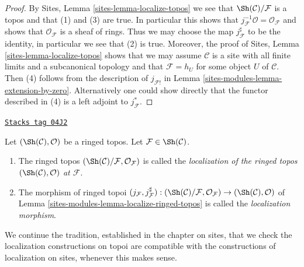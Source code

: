 \begin{proof}
By
Sites, Lemma \ref{sites-lemma-localize-topos}
we see that $\Sh(\mathcal{C})/\mathcal{F}$ is a topos
and that (1) and (3) are true. In particular this shows that
$j_\mathcal{F}^{-1}\mathcal{O} = \mathcal{O}_\mathcal{F}$
and shows that $\mathcal{O}_\mathcal{F}$ is a sheaf of rings.
Thus we may choose the map $j_\mathcal{F}^\sharp$ to be the identity,
in particular we see that (2) is true.
Moreover, the proof of
Sites, Lemma \ref{sites-lemma-localize-topos}
shows that we may assume $\mathcal{C}$ is a site with all finite limits
and a subcanonical topology and that $\mathcal{F} = h_U$ for some object
$U$ of $\mathcal{C}$.
Then (4) follows from the description of $j_{\mathcal{F}!}$ in
Lemma \ref{sites-modules-lemma-extension-by-zero}.
Alternatively one could show directly that the functor described
in (4) is a left adjoint to $j_\mathcal{F}^*$.
\end{proof}

\begin{definition}
\label{sites-modules-definition-localize-ringed-topos}
\href{https://stacks.math.columbia.edu/tag/04J2}{\texttt{Stacks tag 04J2}}

Let $(\Sh(\mathcal{C}), \mathcal{O})$ be a ringed topos.
Let $\mathcal{F} \in \Sh(\mathcal{C})$.
\begin{enumerate}
\item The ringed topos
$(\Sh(\mathcal{C})/\mathcal{F}, \mathcal{O}_\mathcal{F})$
is called the
{\it localization of the ringed topos
$(\Sh(\mathcal{C}), \mathcal{O})$ at $\mathcal{F}$}.
\item The morphism of ringed topoi
$(j_\mathcal{F}, j_\mathcal{F}^\sharp) :
(\Sh(\mathcal{C})/\mathcal{F}, \mathcal{O}_\mathcal{F})
\to
(\Sh(\mathcal{C}), \mathcal{O})$ of
Lemma \ref{sites-modules-lemma-localize-ringed-topos}
is called the {\it localization morphism}.
\end{enumerate}
\end{definition}

We continue the tradition, established in the chapter on sites, that we
check the localization constructions on topoi are compatible with the
constructions of localization on sites, whenever this makes sense.

